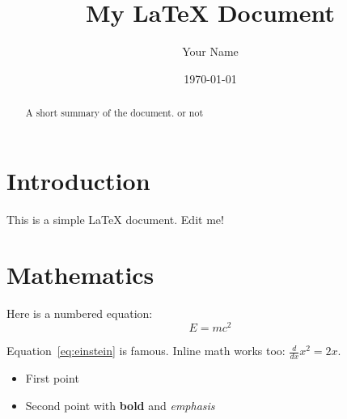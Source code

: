 \documentclass{article}
\title{My LaTeX Document}
\author{Your Name}
\date{\today}
\begin{document}
\maketitle

\begin{abstract}
A short summary of the document. or not
\end{abstract}

\section{Introduction}
This is a simple \LaTeX{} document. Edit me!

\section{Mathematics}
\label{sec:math}

Here is a numbered equation:
\begin{equation}
  E = mc^2 \label{eq:einstein}
\end{equation}

Equation~\eqref{eq:einstein} is famous. Inline math works too: $\frac{d}{dx} x^2 = 2x$.

\begin{itemize}
  \item First point
  \item Second point with \textbf{bold} and \emph{emphasis}
\end{itemize}
\end{document}
